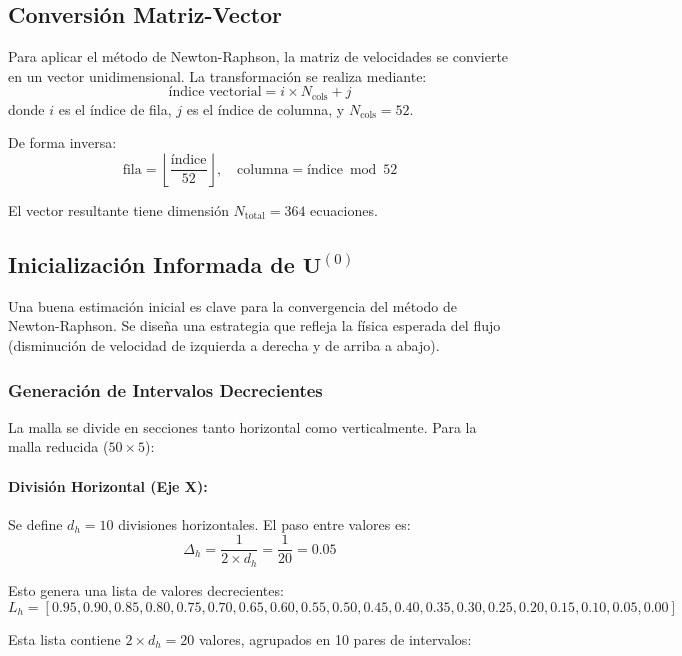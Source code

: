 \documentclass[11pt,letterpaper]{article}
\begin{document}
\subsection{Conversión Matriz-Vector}

Para aplicar el método de Newton-Raphson, la matriz de velocidades se convierte en un vector unidimensional. La transformación se realiza mediante:
\[
\text{índice vectorial} = i \times N_{\text{cols}} + j
\]
donde $i$ es el índice de fila, $j$ es el índice de columna, y $N_{\text{cols}} = 52$.

De forma inversa:
\[
\text{fila} = \left\lfloor \frac{\text{índice}}{52} \right\rfloor, \quad
\text{columna} = \text{índice} \bmod 52
\]

El vector resultante tiene dimensión $N_{\text{total}} = 364$ ecuaciones.

\subsection{Inicialización Informada de $\mathbf{U}^{(0)}$}

Una buena estimación inicial es clave para la convergencia del método de Newton-Raphson. Se diseña una estrategia que refleja la física esperada del flujo (disminución de velocidad de izquierda a derecha y de arriba a abajo).

\subsubsection{Generación de Intervalos Decrecientes}

La malla se divide en secciones tanto horizontal como verticalmente. Para la malla reducida ($50\times5$):

\paragraph{División Horizontal (Eje X):} 
Se define $d_h = 10$ divisiones horizontales. El paso entre valores es:
\[
\Delta_h = \frac{1}{2 \times d_h} = \frac{1}{20} = 0.05
\]

Esto genera una lista de valores decrecientes:
\[
L_h = [0.95, 0.90, 0.85, 0.80, 0.75, 0.70, 0.65, 0.60, 0.55, 0.50, 0.45, 0.40, 0.35, 0.30, 0.25, 0.20, 0.15, 0.10, 0.05, 0.00]
\]

Esta lista contiene $2 \times d_h = 20$ valores, agrupados en 10 pares de intervalos:
\end{document}
